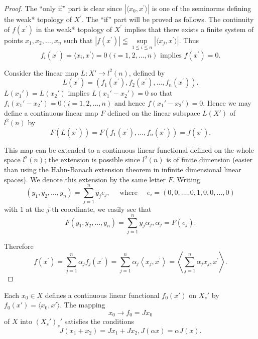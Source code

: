 \begin{proof}
 The ``only if'' part is clear since $\left|\langle x_{0}, x^{\prime}\rangle\right|$ is one of the seminorms defining the weak* topology of $X^{\prime}$. The ``if'' part will be proved as follows. The continuity of $f(x^{\prime})$ in the weak* topology of $X^{\prime}$ implies that there exists a finite system of points $x_{1}, x_{2}, \ldots, x_{n}$ such that $\left|f(x^{\prime})\right| \leqq \sup\limits_{1 \leqq i \leqq n} \left|\langle x_{j}, x^{\prime}\rangle\right|$. Thus 
\[
f _{i} (x ^{\prime}) = \langle x _{i}, x ^{\prime} \rangle = 0 (i = 1, 2, \dots , n) \text{ implies } f (x ^{\prime}) = 0. \]

Consider the linear map $L: X' \to l^2(n)$, defined by 
\[
L \left(x ^{\prime}\right) = \left(f _{1} (x ^{\prime}), f _{2} (x ^{\prime}), \dots , f _{n} (x ^{\prime})\right).
\]
$L(x_1') = L(x_2')$ implies $L(x_1' - x_2') = 0$ so that $f_i(x_1' - x_2') = 0 (i = 1, 2, \ldots, n)$ and hence $f(x_1' - x_2') = 0$. Hence we may define a continuous linear map $F$ defined on the linear subspace $L(X')$ of $l^2(n)$ by 
\[
F \left(L \left(x ^{\prime}\right)\right) = F \left(f _{1} (x ^{\prime}), \dots , f _{n} (x ^{\prime})\right) = f (x ^{\prime}).
\]

This map can be extended to a continuous linear functional defined on the whole space $l^{2}(n)$; the extension is possible since $l^{2}(n)$ is of finite dimension (easier than using the Hahn-Banach extension theorem in infinite dimensional linear spaces). We denote this extension by the same letter $F$. Writing 
\[
(y _{1}, y _{2}, \dots , y _{n}) = \sum\limits_{j=1} ^{n} y _{j} e _{j}, \quad \text{ where } \quad e _{i} = (0, 0, \dots , 0, 1, 0, 0, \dots , 0)
\]
with $1$ at the $j$-th coordinate, 
we easily see that 
\[
F \left(y _{1}, y _{2}, \dots , y _{n}\right) = \sum\limits_{j=1} ^{n} y _{j} \alpha_{j}, \alpha_{j} = F \left(e _{j}\right).
\]

Therefore 
\[
f \left(x ^{\prime}\right) = \sum\limits_{j=1} ^{n} \alpha_{j} f _{j} \left(x ^{\prime}\right) = \sum\limits_{j=1} ^{n} \alpha_{j} \left\langle x _{j}, x ^{\prime} \right\rangle = \left\langle \sum\limits_{j=1} ^{n} \alpha_{j} x _{j}, x ^{\prime} \right\rangle .
\]
\end{proof}
\begin{corollaryu} Each $x_0 \in X$ defines a continuous linear functional $f_0(x')$ on $X_s'$ by $f_0(x') = \langle x_0, x' \rangle$. The mapping 
\[
x _{0} \rightarrow f _{0} = J x _{0}
\]
of $X$ into $(X_s')_s'$ satisfies the conditions 
\[
J \left(x _{1} + x _{2}\right) = J x _{1} + J x _{2}, J (\alpha x) = \alpha J (x).
\]
\end{corollaryu}

